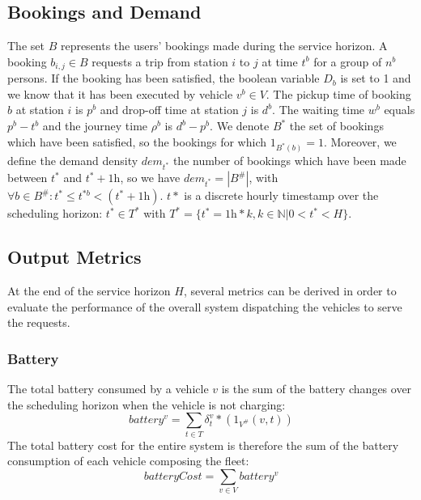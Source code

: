 \documentclass[12pt,a4paper]{article}
\begin{document}
\subsection{Bookings and Demand}\label{bookings}
The set $B$ represents the users' bookings made during the service horizon. A booking $b_{i,j} \in B$ requests a trip from station $i$ to $j$ at time $t^{b}$ for a group of $n^{b}$ persons. If the booking has been satisfied, the boolean variable $D_{b}$ is set to 1 and we know that it has been executed by vehicle $v^{b} \in V$. The pickup time of booking $b$ at station $i$ is $p^{b}$ and drop-off time at station $j$ is $d^{b}$. The waiting time $w^{b}$ equals $p^{b} - t^{b}$ and the journey time $\rho^{b}$ is $d^{b} - p^{b}$. We denote $B^{*}$ the set of bookings which have been satisfied, so the bookings for which $1_{B^{*}(b)} = 1$. Moreover, we define the demand density $dem_{t^{*}}$ the number of bookings which have been made between $t^{*}$ and $t^{*} + 1\text{h}$, so we have $dem_{t^{*}} = |B^{\#}|$, with $\forall b \in B^{\#}: t^{*} \leq t^{*b} < (t^{*}+1\text{h})$. $t{*}$ is a discrete hourly timestamp over the scheduling horizon: $t^{*} \in T^{*}$ with $T^{*} = \{t^{*} = 1\text{h} * k, k \in \mathbb{N} | 0 < t^{*} < H\}$.

\subsection{Output Metrics}\label{metrics}
At the end of the service horizon $H$, several metrics can be derived in order to evaluate the performance of the overall system dispatching the vehicles to serve the requests. 

\subsubsection*{Battery}
The total battery consumed by a vehicle $v$ is the sum of the battery changes over the scheduling horizon when the vehicle is not charging:
$$battery^{v} = \sum_{t \in T}\delta^{v}_{t} * (1_{V^{\#}}(v,t)) $$
The total battery cost for the entire system is therefore the sum of the battery consumption of each vehicle composing the fleet:
$$batteryCost = \sum_{v \in V}battery^{v}$$
\end{document}
